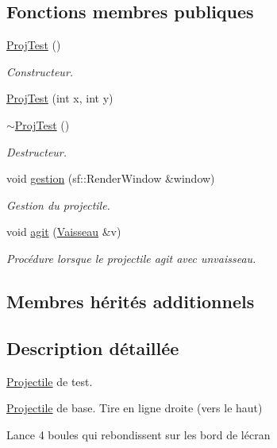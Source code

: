 \subsection*{Fonctions membres publiques}
\begin{DoxyCompactItemize}
\item 
\hyperlink{class_proj_test_a64855e6e7ef8219566ab0fde2b05a9e1}{Proj\+Test} ()
\begin{DoxyCompactList}\small\item\em Constructeur. \end{DoxyCompactList}\item 
\hyperlink{class_proj_test_ae1611498a5b25d561998068205e9f77f}{Proj\+Test} (int x, int y)
\item 
\hyperlink{class_proj_test_a9bc10c512035ae9f3294179c5d2db808}{$\sim$\+Proj\+Test} ()
\begin{DoxyCompactList}\small\item\em Destructeur. \end{DoxyCompactList}\item 
void \hyperlink{class_proj_test_a6649e6591e463315aa9513854e2515d4}{gestion} (sf\+::\+Render\+Window \&window)
\begin{DoxyCompactList}\small\item\em Gestion du projectile. \end{DoxyCompactList}\item 
void \hyperlink{class_proj_test_a3adb674973dcd21c6ddaee809b719a65}{agit} (\hyperlink{class_vaisseau}{Vaisseau} \&v)
\begin{DoxyCompactList}\small\item\em Procédure lorsque le projectile agit avec unvaisseau. \end{DoxyCompactList}\end{DoxyCompactItemize}
\subsection*{Membres hérités additionnels}


\subsection{Description détaillée}
\hyperlink{class_projectile}{Projectile} de test. 

\hyperlink{class_projectile}{Projectile} de base. Tire en ligne droite (vers le haut)

Lance 4 boules qui rebondissent sur les bord de l\textquotesingle{}écran 

